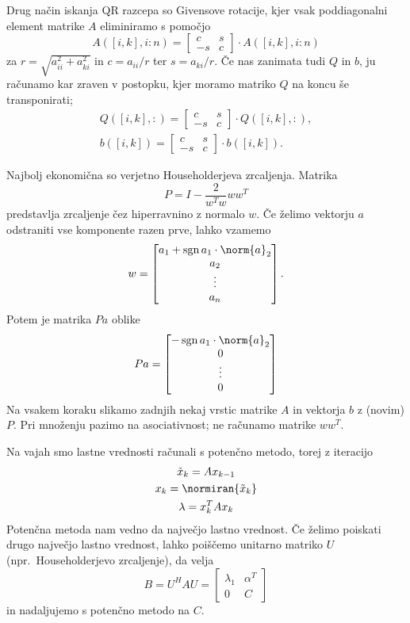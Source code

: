 Drug način iskanja QR razcepa so Givensove rotacije, kjer vsak poddiagonalni
element matrike $A$ eliminiramo s pomočjo
\[
  A([i,k], i:n) =
  \begin{bmatrix}
	c & s \\ -s & c
  \end{bmatrix}
  \cdot A([i,k], i:n)
\]
za $r = \sqrt{a_{ii}^2 + a_{ki}^2}$ in $c = a_{ii} / r$ ter $s = a_{ki} / r$.
Če nas zanimata tudi $Q$ in $b$, ju računamo kar zraven v postopku, kjer moramo
matriko $Q$ na koncu še transponirati;
\begin{gather*}
  Q([i,k], :) =
  \begin{bmatrix}
	c & s \\ -s & c
  \end{bmatrix}
  \cdot Q([i,k], :), \\
  b([i,k]) =
  \begin{bmatrix}
	c & s \\ -s & c
  \end{bmatrix}
  \cdot b([i,k]).
\end{gather*}

Najbolj ekonomična so verjetno Householderjeva zrcaljenja.
Matrika
\[
  P = I - \frac{2}{w^T w} w w^T
\]
predstavlja zrcaljenje čez hiperravnino z normalo $w$.
Če želimo vektorju $a$ odstraniti vse komponente razen prve, lahko vzamemo
\[
  w =
  \begin{bmatrix}
	a_1 + \operatorname{sgn} a_1 \cdot \norm{a}_2 \\
	a_2 \\
	\vdots \\
	a_n
  \end{bmatrix}.
\]
Potem je matrika $Pa$ oblike
\[
  Pa =
  \begin{bmatrix}
	-\operatorname{sgn} a_1 \cdot \norm{a}_2 \\
	0 \\ \vdots \\ 0
  \end{bmatrix}
\]
Na vsakem koraku slikamo zadnjih nekaj vrstic matrike $A$ in vektorja $b$ z
(novim) $P$.
Pri množenju pazimo na asociativnost; ne računamo matrike $w w^T$.


Na vajah smo lastne vrednosti računali s potenčno metodo, torej z iteracijo
\begin{gather*}
  \tilde{x}_k = A x_{k-1} \\
  x_k = \normiran{\tilde{x}_k} \\
  \lambda = x_k^T A x_k
\end{gather*}
Potenčna metoda nam vedno da največjo lastno vrednost.
Če želimo poiskati drugo največjo lastno vrednost, lahko poiščemo unitarno
matriko $U$ (npr.~Householderjevo zrcaljenje), da velja
\[
  B = U^H A U =
  \begin{bmatrix}
	\lambda_1 & \alpha^T \\ 0 & C
  \end{bmatrix}
\]
in nadaljujemo s potenčno metodo na $C$.

